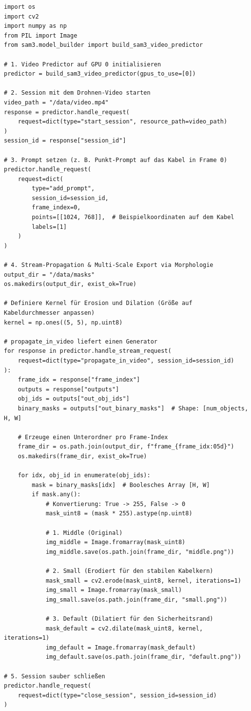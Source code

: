 \documentclass[12pt,a4paper]{article}
\begin{document}
\begin{verbatim}
import os
import cv2
import numpy as np
from PIL import Image
from sam3.model_builder import build_sam3_video_predictor

# 1. Video Predictor auf GPU 0 initialisieren
predictor = build_sam3_video_predictor(gpus_to_use=[0])

# 2. Session mit dem Drohnen-Video starten
video_path = "/data/video.mp4"
response = predictor.handle_request(
    request=dict(type="start_session", resource_path=video_path)
)
session_id = response["session_id"]

# 3. Prompt setzen (z. B. Punkt-Prompt auf das Kabel in Frame 0)
predictor.handle_request(
    request=dict(
        type="add_prompt",
        session_id=session_id,
        frame_index=0,
        points=[[1024, 768]],  # Beispielkoordinaten auf dem Kabel
        labels=[1]
    )
)

# 4. Stream-Propagation & Multi-Scale Export via Morphologie
output_dir = "/data/masks"
os.makedirs(output_dir, exist_ok=True)

# Definiere Kernel für Erosion und Dilation (Größe auf Kabeldurchmesser anpassen)
kernel = np.ones((5, 5), np.uint8)

# propagate_in_video liefert einen Generator
for response in predictor.handle_stream_request(
    request=dict(type="propagate_in_video", session_id=session_id)
):
    frame_idx = response["frame_index"]
    outputs = response["outputs"]
    obj_ids = outputs["out_obj_ids"]
    binary_masks = outputs["out_binary_masks"]  # Shape: [num_objects, H, W]

    # Erzeuge einen Unterordner pro Frame-Index
    frame_dir = os.path.join(output_dir, f"frame_{frame_idx:05d}")
    os.makedirs(frame_dir, exist_ok=True)

    for idx, obj_id in enumerate(obj_ids):
        mask = binary_masks[idx]  # Boolesches Array [H, W]
        if mask.any():
            # Konvertierung: True -> 255, False -> 0
            mask_uint8 = (mask * 255).astype(np.uint8)
            
            # 1. Middle (Original)
            img_middle = Image.fromarray(mask_uint8)
            img_middle.save(os.path.join(frame_dir, "middle.png"))
            
            # 2. Small (Erodiert für den stabilen Kabelkern)
            mask_small = cv2.erode(mask_uint8, kernel, iterations=1)
            img_small = Image.fromarray(mask_small)
            img_small.save(os.path.join(frame_dir, "small.png"))
            
            # 3. Default (Dilatiert für den Sicherheitsrand)
            mask_default = cv2.dilate(mask_uint8, kernel, iterations=1)
            img_default = Image.fromarray(mask_default)
            img_default.save(os.path.join(frame_dir, "default.png"))

# 5. Session sauber schließen
predictor.handle_request(
    request=dict(type="close_session", session_id=session_id)
)
\end{verbatim}
\end{document}
